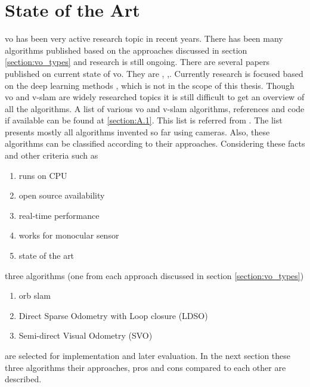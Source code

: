 \section{State of the Art}
\acrshort{vo} has been very active research topic in recent years. There has been many algorithms published based on the approaches discussed in section \ref{section:vo_types} and research is still ongoing. There are several papers published on current state of \acrshort{vo}. They are \cite{Aqel-et-al-2016}, \cite{KhalidYousif-et-al-2015} ,\cite{ScaramuzzaVO}. Currently research is focused based on the deep learning methods \cite{7989236}, \cite{yang20d3vo} which is not in the scope of this thesis. Though \acrshort{vo} and \acrshort{v-slam} are widely researched topics it is still difficult to get an overview of all the algorithms. A list of various \acrshort{vo} and \acrshort{v-slam} algorithms, references and code if available can be found at \ref{section:A.1}. This list is referred from \cite{chris}. The list presents mostly all algorithms invented so far using cameras. Also, these algorithms can be classified according to their approaches. Considering these facts and other criteria such as
\begin{enumerate}
	\item runs on CPU 
	\item open source availability 
	\item real-time performance
	\item works for monocular sensor
	\item state of the art
\end{enumerate}	
three algorithms (one from each approach discussed in section \ref{section:vo_types})
\begin{enumerate}
    \item \acrshort{orb} \acrshort{slam} \cite{Mur-Artal} 
    \item Direct Sparse Odometry with Loop closure (LDSO)\cite{gao2018ldso} 
  	\item Semi-direct Visual Odometry (SVO) \cite{7782863} 
\end{enumerate}	     
are selected for implementation and later evaluation. In the next section these three algorithms their approaches, pros and cons compared to each other are described.

